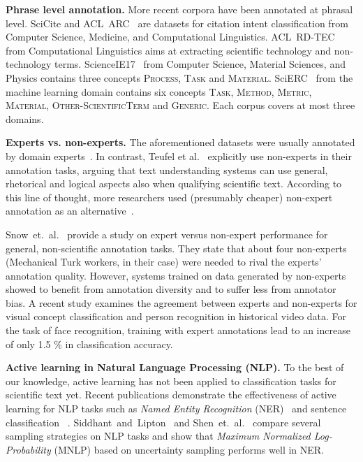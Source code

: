\documentclass[runningheads]{llncs}
\begin{document}
\textbf{Phrase level annotation.}
More recent corpora have been annotated at phrasal level.
SciCite\cite{Cohan2019StructuralSF} and ACL~ARC~\cite{Jurgens2018MeasuringTE} are datasets for citation intent classification from Computer Science, Medicine, and Computational Linguistics.
ACL~RD-TEC~\cite{handschuh2014acl} from Computational Linguistics aims at extracting scientific technology and non-technology terms.
ScienceIE17~\cite{augenstein2017semeval} from Computer Science, Material Sciences, and Physics contains three concepts \textsc{Process}, \textsc{Task} and \textsc{Material}.
SciERC~\cite{Luan2018MultiTaskIO} from the machine learning domain contains six concepts \textsc{Task}, \textsc{Method}, \textsc{Metric}, \textsc{Material}, \textsc{Other-Scien\-tific\-Term} and \textsc{Generic}. 
Each corpus covers at most three domains.

\textbf{Experts vs. non-experts.}
The aforementioned datasets were usually annotated by domain experts~\cite{Dernoncourt2017PubMed2R,Kim2011AutomaticCO,augenstein2017semeval,Luan2018MultiTaskIO,handschuh2014acl,Liakata2010CorporaFT}. 
In contrast, Teufel et al.~\cite{teufel2009towards} explicitly use non-experts in their annotation tasks, arguing that text understanding systems can use general, rhetorical and logical aspects also when qualifying scientific text. According to this line of thought, more researchers used (presumably cheaper) non-expert annotation as an alternative~\cite{Fisas2015OnTD,Chambers2013}.

Snow~et.~al.~\cite{Snow2008CheapAF} provide a study on expert versus non-expert performance for general, non-scientific annotation tasks. They state that about four non-experts (Mechanical Turk workers, in their case) were needed to rival the experts' annotation quality. However, systems trained on data generated by non-experts showed to benefit from annotation diversity and to suffer less from annotator bias. A recent study \cite{PustuIren2019InvestigatingCO} examines the agreement between experts and non-experts for visual concept classification and person recognition in historical video data. For the task of face recognition, training with expert annotations lead to an increase of only 1.5 \% in classification accuracy.

\textbf{Active learning in Natural Language Processing (NLP).}
To the best of our knowledge, active learning has not been applied to classification tasks for scientific text yet.
Recent publications demonstrate the effectiveness of active learning for NLP tasks such as \textit{Named Entity Recognition} (NER)~\cite{Shen2017DeepAL} and sentence classification~ \cite{Zhang2016ActiveDT}. Siddhant~and~Lipton~\cite{Siddhant2018DeepBA} and Shen~et.~al.~\cite{Shen2017DeepAL} compare several sampling strategies on NLP tasks and show that \emph{Maximum Normalized Log-Probability} (MNLP) based on uncertainty sampling performs well in NER. 
 
\end{document}
